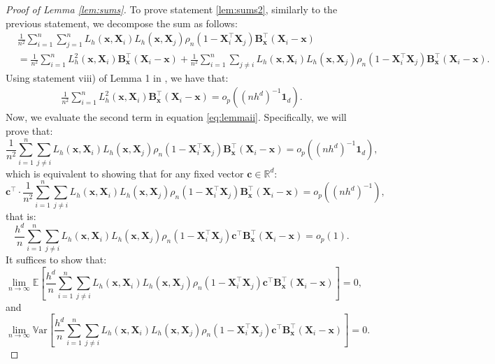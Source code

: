 \documentclass[12pt]{report} %
\newcommand{\bX}{\mathbf{X}}
\newcommand{\bx}{\mathbf{x}}
\newcommand{\bc}{\mathbf{c}}
\newcommand{\bB}{\mathbf{B}}
\newcommand{\lc}{\left[}
\newcommand{\rc}{\right]}
\newcommand{\V}[1]{\mathbb{V}\mathrm{ar}\lc #1\rc}
\begin{document}
\begin{proof}[Proof of Lemma \ref{lem:sums}]
To prove statement \ref{lem:sums2}, similarly to the previous statement, we decompose the sum as follows:
\begin{align}
&\frac{1}{n^2} \sum_{i=1}^n \sum_{j=1}^n L_h\left(\bx, \bX_i\right) 
L_h\left(\bx, \bX_j\right) \rho_n\left(1-\bX_i^\top\bX_j\right)
\bB_{\bx}^\top\left(\bX_i -\bx\right)\nonumber\\
&=\frac{1}{n^2} \sum_{i=1}^n L_h^2\left(\bx, \bX_i\right)
\bB_{\bx}^\top\left(\bX_i -\bx\right)
+\frac{1}{n^2} \sum_{i=1}^n\sum_{j\neq i} L_h\left(\bx, \bX_i\right)
L_h\left(\bx, \bX_j\right)\rho_n\left(1-\bX_i^\top\bX_j\right)
\bB_{\bx}^\top\left(\bX_i -\bx\right).
\label{eq:lemmaii}
\end{align}
Using statement viii) of Lemma 1 in \citet{Garcia-Portugues2016}, we have that:
\begin{align}
\frac{1}{n^2} \sum_{i=1}^n L_h^2\left(\bx, \bX_i\right) 
\bB_{\bx}^\top\left(\bX_i -\bx\right) 
= o_p\!\left(\left(nh^d\right)^{-1}\mathbf{1}_d\right).
\label{eq:lemmaii1}
\end{align}
Now, we evaluate the second term in equation \eqref{eq:lemmaii}. Specifically, we will prove that:
\begin{equation*}
\frac{1}{n^2} \sum_{i=1}^n\sum_{j\neq i} L_h\left(\bx, \bX_i\right)
L_h\left(\bx, \bX_j\right)\rho_n\left(1-\bX_i^\top\bX_j\right)
\bB_{\bx}^\top\left(\bX_i -\bx\right) 
= o_p\!\left(\left(nh^d\right)^{-1}\mathbf{1}_d\right),
\end{equation*}
which is equivalent to showing that for any fixed vector 
$\bc \in \mathbb{R}^d$:
\begin{equation*}
\bc^\top \cdot \frac{1}{n^2} \sum_{i=1}^n\sum_{j\neq i} 
L_h\left(\bx, \bX_i\right)L_h\left(\bx, \bX_j\right)
\rho_n\left(1-\bX_i^\top\bX_j\right)
\bB_{\bx}^\top\left(\bX_i -\bx\right) 
= o_p\!\left(\left(nh^d\right)^{-1}\right),
\end{equation*}
that is:
\begin{equation*}
\frac{h^d}{n} \sum_{i=1}^n\sum_{j\neq i} 
L_h\left(\bx, \bX_i\right)L_h\left(\bx, \bX_j\right)
\rho_n\left(1-\bX_i^\top\bX_j\right)
\bc^\top\bB_{\bx}^\top\left(\bX_i -\bx\right) 
= o_p\!\left(1\right).
\end{equation*}
It suffices to show that:
\begin{equation*}
\lim_{n \rightarrow \infty} \mathbb{E}\!\left[
\frac{h^d}{n} \sum_{i=1}^n\sum_{j\neq i} 
L_h\left(\bx, \bX_i\right)L_h\left(\bx, \bX_j\right)
\rho_n\left(1-\bX_i^\top\bX_j\right)
\bc^\top\bB_{\bx}^\top\left(\bX_i -\bx\right)
\right] = 0,
\end{equation*}
and
\begin{equation*}
\lim_{n \rightarrow \infty} \V{
\frac{h^d}{n} \sum_{i=1}^n\sum_{j\neq i} 
L_h\left(\bx, \bX_i\right)L_h\left(\bx, \bX_j\right)
\rho_n\left(1-\bX_i^\top\bX_j\right)
\bc^\top\bB_{\bx}^\top\left(\bX_i -\bx\right)
} = 0.
\end{equation*}


\end{proof}
\end{document}
